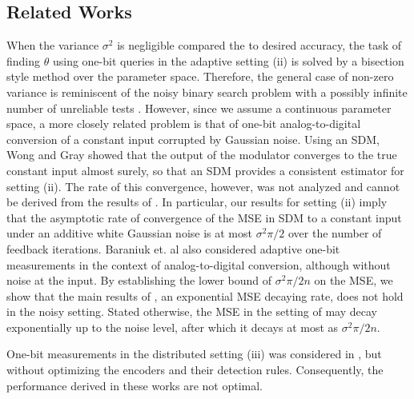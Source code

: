 \documentclass[letterpaper, 11pt]{IEEEtran}      %
\begin{document}
\subsection*{Related Works}
When the variance $\sigma^2$ is negligible compared the to desired accuracy, the task of finding $\theta$ using one-bit queries in the adaptive setting (ii) is solved by a bisection style method over the parameter space. Therefore, the general case of non-zero variance is reminiscent of the noisy binary search problem with a possibly infinite number of unreliable tests \cite{cicalese2002least, Karp:2007:NBS:1283383.1283478}. However, since we assume a continuous parameter space, a more closely related problem is that of one-bit analog-to-digital conversion of a constant input corrupted by Gaussian noise. Using an SDM, Wong and Gray \cite{53738} showed that the output of the modulator converges to the true constant input almost surely, so that an SDM provides a consistent estimator for setting (ii). The rate of this convergence, however, was not analyzed and cannot be derived from the results of \cite{53738}. In particular, our results for setting (ii) imply that the asymptotic rate of convergence of the MSE in SDM to a constant input under an additive white Gaussian noise is at most $\sigma^2\pi/2$ over the number of feedback iterations. Baraniuk et. al \cite{baraniuk2017exponential} also considered adaptive one-bit measurements in the context of analog-to-digital conversion, although without noise at the input. By establishing the lower bound of $\sigma^2\pi/2n$ on the MSE, we show that the main results of \cite{baraniuk2017exponential}, an exponential MSE decaying rate, does not hold in the noisy setting. Stated otherwise, the MSE in the setting of \cite{baraniuk2017exponential} may decay exponentially up to the noise level, after which it decays at most as $\sigma^2\pi/2n$. \par
%
One-bit measurements in the distributed setting (iii) was considered in \cite{904560,4244748, 6882252, chen2010performance, 5184907}, but without optimizing the encoders and their detection rules. Consequently, the performance derived in these works are not optimal. 
\end{document}
